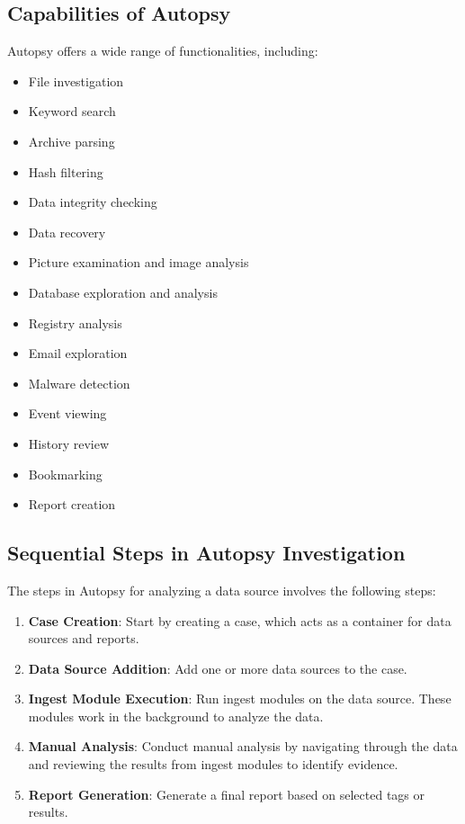 \documentclass{extarticle}
\begin{document}
\subsection{Capabilities of Autopsy}
Autopsy offers a wide range of functionalities, including:
\begin{itemize}
    \item File investigation
    \item Keyword search
    \item Archive parsing
    \item Hash filtering
    \item Data integrity checking
    \item Data recovery
    \item Picture examination and image analysis
    \item Database exploration and analysis
    \item Registry analysis
    \item Email exploration
    \item Malware detection
    \item Event viewing
    \item History review
    \item Bookmarking
    \item Report creation
\end{itemize}

\subsection{Sequential Steps in Autopsy Investigation}
The steps in Autopsy for analyzing a data source involves the following steps:
\begin{enumerate}
    \item \textbf{Case Creation}: Start by creating a case, which acts as a container for data sources and reports.
    \item \textbf{Data Source Addition}: Add one or more data sources to the case.
    \item \textbf{Ingest Module Execution}: Run ingest modules on the data source. These modules work in the background to analyze the data.
    \item \textbf{Manual Analysis}: Conduct manual analysis by navigating through the data and reviewing the results from ingest modules to identify evidence.
    \item \textbf{Report Generation}: Generate a final report based on selected tags or results.
\end{enumerate}
\end{document}
